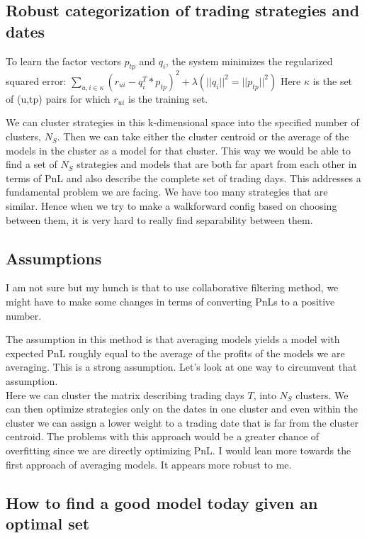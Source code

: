 \documentclass[a4paper]{article}
\begin{document}
\subsection{Robust categorization of trading strategies and dates}
\label{subsec:robust-collaborative-filtering}
To learn the factor vectors $p_{tp}$ and $q_i$, the system minimizes the regularized squared error:
$\sum\limits_{u,i \in \kappa} (r_{ui} - q_i^T*p_{tp})^2 + \lambda(||q_i||^2 = ||p_{tp}||^2)$
Here $\kappa$ is the set of (u,tp) pairs for which $r_{ui}$ is the training set.

We can cluster strategies in this k-dimensional space into
the specified number of clusters, $N_S$. Then we can take either the cluster
centroid or the average of the models in the cluster as a model for
that cluster. This way we would be able to find a set of $N_S$
strategies and models that are both far apart from each other in terms of PnL and also
describe the complete set of trading days. This addresses a
fundamental problem we are facing. We have too many strategies that
are similar. Hence when we try to make a walkforward config based on
choosing between them, it is very hard to really find separability
between them. 

\subsection{Assumptions}
\label{subsec:assumptions}
I am not sure but my hunch is that to use collaborative filtering
method, we might have to make some
changes in terms of converting PnLs to a positive number. 

The assumption in this method is that averaging
models yields a model with expected PnL roughly equal to the average
of the profits of the models we are averaging. This is a strong
assumption. Let's look at one way to circumvent that assumption.\\
Here we can cluster the matrix describing trading days $T$, into $N_S$
clusters. We can then optimize strategies only on the dates in one
cluster and even within the cluster we can assign a lower weight to a trading
date that is far from the cluster centroid. The problems with this
approach would be a greater chance of overfitting since we are
directly optimizing PnL. I would lean more towards the first approach
of averaging models. It appears more robust to me.

\subsection{How to find a good model today given an optimal set}
\label{subsec:daily-retraining}
\end{document}
